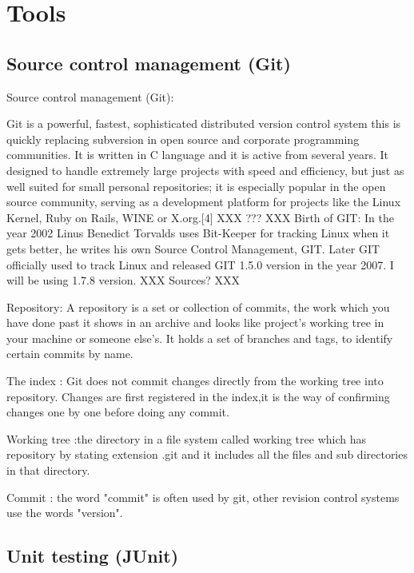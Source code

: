 \documentclass{article}
\begin{document}
\section{Tools}
\label{sec:Tools}

\subsection{Source control management (Git)}
\label{sec:scm}

Source control management (Git):

Git is a powerful, fastest, sophisticated distributed version control system this is quickly replacing subversion in open source and corporate programming communities. It is written in C language and it is active from several years. It designed to handle extremely large projects with speed and efficiency,	but just as well suited for small personal repositories; it is especially popular in the open source community, serving as a development platform for projects like the Linux Kernel, Ruby on Rails, WINE or X.org.[4] XXX ??? XXX
Birth of GIT:
In the year 2002 Linus Benedict Torvalds uses Bit-Keeper for tracking Linux when it gets better, he writes his own Source Control Management, GIT. Later GIT officially used to track Linux and released GIT 1.5.0 version in the year 2007.
I will be using 1.7.8 version. XXX Sources? XXX

Repository:  A repository is a set or collection of commits, the work which you have done past it shows in an archive and looks like project's working tree in your machine or someone else's. It holds a set of branches and tags, to identify certain commits by name.

The index : Git does not commit changes directly from the working tree into repository. Changes are first registered in the index,it is the way of confirming changes one by one before doing any commit.																										

Working tree :the directory in a file system called working tree which has repository by stating extension .git and it includes all the files and sub directories in that  directory.

Commit : the word "commit" is often used by git, other revision control systems use the words "version".


\subsection{Unit testing (JUnit)}
\label{sec:junit}
\end{document}
